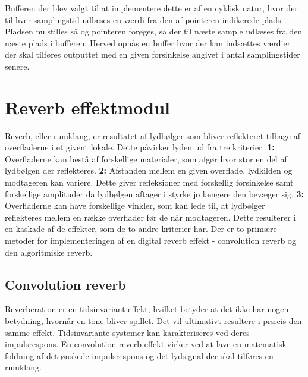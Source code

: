 Bufferen der blev valgt til at implementere dette er af en cyklisk natur, hvor der til hver samplingstid udlæses en værdi fra den af pointeren indikerede plads. Pladsen nulstilles så og pointeren forøges, så der til næste sample udlæses fra den næste plads i bufferen.
Herved opnås en buffer hvor der kan indsættes værdier der skal tilføres outputtet med en given forsinkelse angivet i antal samplingstider senere.

\section{Reverb effektmodul}\label{sec:reverb}
Reverb, eller rumklang, er resultatet af lydbølger som bliver reflekteret tilbage af %
overfladerne i et givent lokale. Dette påvirker lyden ud fra tre kriterier.\newline 
\textbf{1:} Overfladerne kan bestå af forskellige materialer, som afgør hvor stor en del af lydbølgen der reflekteres.\newline 
\textbf{2:} Afstanden mellem en given overflade, lydkilden og modtageren kan variere. Dette giver refleksioner med forskellig forsinkelse samt forskellige amplituder da lydbølgen aftager i styrke jo længere den bevæger sig.\newline 
\textbf{3:} Overfladerne kan have forskellige vinkler, som kan lede til, at lydbølger reflekteres mellem en række overflader før de når modtageren. Dette resulterer i en kaskade af de effekter, som de to andre kriterier har.\newline
Der er to primære metoder for implementeringen af en digital reverb effekt - convolution reverb og den algoritmiske reverb.

\subsection{Convolution reverb}
Reverberation er en tidsinvariant effekt, hvilket betyder at det ikke har nogen betydning, hvornår en tone bliver spillet. Det vil ultimativt resultere i præcis den samme effekt. \newline
Tidsinvariante systemer kan karakteriseres ved deres impulsrespons.
En convolution reverb effekt virker ved at lave en matematisk foldning af det ønskede %
impulsrespons og det lydsignal der skal tilføres en rumklang.\newline 

